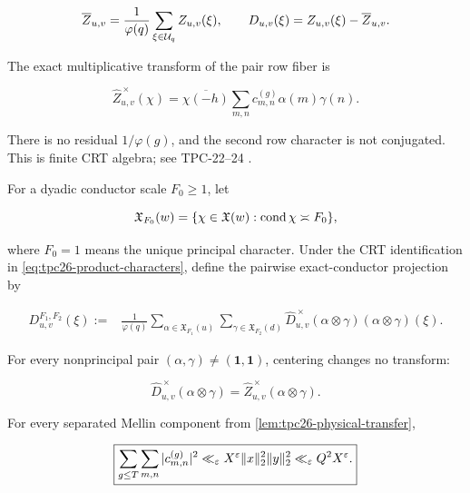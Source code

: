 \begin{equation}
 \overline Z_{u,v}
 =\frac1{\varphi(q)}\sum_{\xi\in\mathcal U_q}Z_{u,v}(\xi),
 \qquad
 D_{u,v}(\xi)=Z_{u,v}(\xi)-\overline Z_{u,v}.
 \label{eq:tpc26-pair-mean-discrepancy}
\end{equation}

The exact multiplicative transform of the pair row fiber is

\begin{equation}
 \widehat Z_{u,v}^{\,\times}(\chi)
 =\overline{\chi(-h)}
 \sum_{m,n}c_{m,n}^{(g)}\alpha(m)\gamma(n).
 \label{eq:tpc26-pair-transform}
\end{equation}

There is no residual \(1/\varphi(g)\), and the second row character is
not conjugated.  This is finite CRT algebra; see TPC-22--24
\citep{WangTPC22,WangTPC23,WangTPC24}.

For a dyadic conductor scale \(F_0\ge1\), let

\begin{equation}
 \mathfrak X_{F_0}(w)
 =\{\chi\in\mathfrak X(w):\operatorname{cond}\chi\asymp F_0\},
 \label{eq:tpc26-exact-conductor-family}
\end{equation}

where \(F_0=1\) means the unique principal character.  Under the CRT
identification in \eqref{eq:tpc26-product-characters}, define the
pairwise exact-conductor projection by

\begin{align}
 D_{u,v}^{F_1,F_2}(\xi)
 :={}&\frac1{\varphi(q)}
 \sum_{\alpha\in\mathfrak X_{F_1}(u)}
 \sum_{\gamma\in\mathfrak X_{F_2}(d)}
 \widehat D_{u,v}^{\,\times}(\alpha\otimes\gamma)
 (\alpha\otimes\gamma)(\xi).
 \label{eq:tpc26-pair-conductor-projection}
\end{align}

For every nonprincipal pair \((\alpha,\gamma)\ne(\mathbf1,\mathbf1)\),
centering changes no transform:

\begin{equation}
 \widehat D_{u,v}^{\,\times}(\alpha\otimes\gamma)
 =\widehat Z_{u,v}^{\,\times}(\alpha\otimes\gamma).
 \label{eq:tpc26-centering-transform}
\end{equation}

\begin{lemma}
\label{lem:tpc26-compatibility-energy}
For every separated Mellin component from
\cref{lem:tpc26-physical-transfer},

\begin{equation}
 \boxed{
 \sum_{g\le T}\sum_{m,n}|c_{m,n}^{(g)}|^2
 \ll_\varepsilon X^\varepsilon\|x\|_2^2\|y\|_2^2
 \ll_\varepsilon Q^2X^\varepsilon.}
 \label{eq:tpc26-compatibility-energy}
\end{equation}
\end{lemma}

